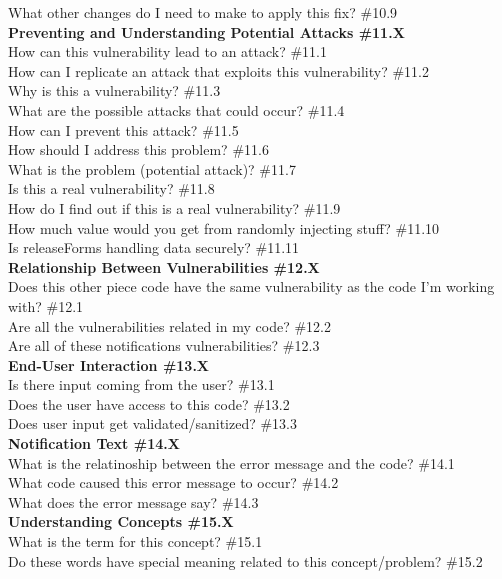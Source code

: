 \documentclass[10pt,journal,compsoc]{IEEEtran}
\begin{document}
	What other changes do I need to make to apply this fix? \#10.9 \\
\textbf{Preventing and Understanding Potential Attacks \#11.X} \\
	How can this vulnerability lead to an attack?  \#11.1 \\
	How can I replicate an attack that exploits this vulnerability? \#11.2 \\
	Why is this a vulnerability? \#11.3 \\
	What are the possible attacks that could occur? \#11.4  \\
	How can I prevent this attack? \#11.5 \\
	How should I address this problem?  \#11.6 \\
	What is the problem (potential attack)? \#11.7 \\
	Is this a real vulnerability? \#11.8 \\
	How do I find out if this is a real vulnerability? \#11.9 \\
	How much value would you get from randomly injecting stuff? \#11.10 \\
	Is releaseForms handling data securely? \#11.11 \\
\textbf{Relationship Between Vulnerabilities \#12.X} \\
	Does this other piece code have the same vulnerability as the code I'm working with?  \#12.1 \\
	Are all the vulnerabilities related in my code? \#12.2 \\
	Are all of these notifications vulnerabilities?  \#12.3 \\
\textbf{End-User Interaction \#13.X} \\
	Is there input coming from the user? \#13.1 \\
	Does the user have access to this code? \#13.2 \\
	Does user input get validated/sanitized? \#13.3 \\
\textbf{Notification Text \#14.X} \\
	What is the relatinoship between the error message and the code? \#14.1 \\
	What code caused this error message to occur? \#14.2 \\
	What does the error message say? \#14.3 \\
\textbf{Understanding Concepts \#15.X} \\
	What is the term for this concept? \#15.1 \\
	Do these words have special meaning related to this concept/problem? \#15.2 \\
\end{document}
